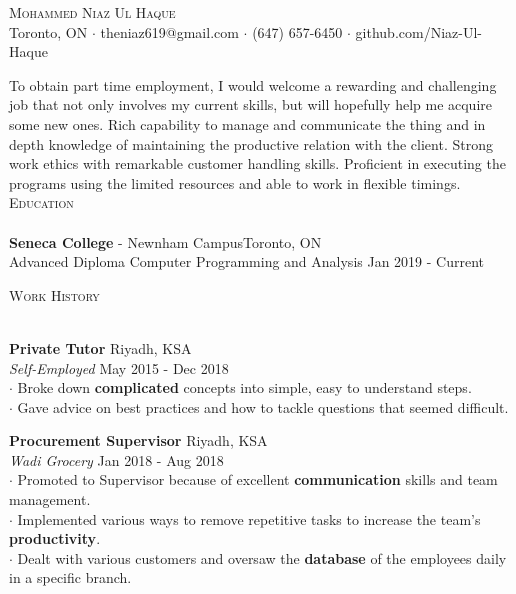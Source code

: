 \documentclass[a4paper]{article}
\newcommand{\lineunder} {
    \vspace*{-8pt} \\
    \hspace*{-18pt} \hrulefill \\
}
\newcommand{\header} [1] {
    {\hspace*{-18pt}\vspace*{6pt} \textsc{#1}}
    \vspace*{-6pt} \lineunder
}
\begin{document}
\vspace*{-40pt}

    

\vspace*{-10pt}
\begin{center}
	{\Huge \scshape {Mohammed Niaz Ul Haque}}\\
	Toronto, ON $\cdot$ theniaz619@gmail.com $\cdot$ (647) 657-6450 $\cdot$ github.com/Niaz-Ul-Haque\\
\end{center}

\text To obtain part time employment, I would welcome a rewarding and challenging job that not only involves my current skills, but will hopefully help me acquire some new ones. Rich capability to manage and communicate the thing and in depth knowledge of maintaining the productive relation with the client. Strong work ethics with remarkable customer handling skills. Proficient in executing the programs using the limited resources and able to work in flexible timings.\\
\vspace{2mm}
{\large\header{Education}}
\textbf{Seneca College} - Newnham Campus\hfill Toronto, ON\\
{Advanced Diploma} Computer Programming and Analysis \hfill Jan 2019 - Current\\


\vspace{2mm}

{\large\header{Work History}}
\vspace{0.6mm}

\textbf{Private Tutor} \hfill Riyadh, KSA\\
\textit{Self-Employed} \hfill May 2015 - Dec 2018\\\vspace*{0.5mm}
$\cdot$ Broke down {\textbf{complicated}} concepts into simple, easy to understand steps.\\
$\cdot$ Gave advice on best practices and how to tackle questions that seemed difficult.
\vspace*{2mm}

\textbf{Procurement Supervisor} \hfill Riyadh, KSA\\
\textit{Wadi Grocery} \hfill Jan 2018 - Aug 2018\\\vspace*{0.5mm}
$\cdot$ Promoted to Supervisor because of excellent {\textbf{communication}} skills and team management.\\
$\cdot$ Implemented various ways to remove repetitive tasks to increase the team’s {\textbf{productivity}}.\\
$\cdot$ Dealt with various customers and oversaw the {\textbf{database}} of the employees daily in a specific branch.
\vspace*{2mm}
\end{document}
